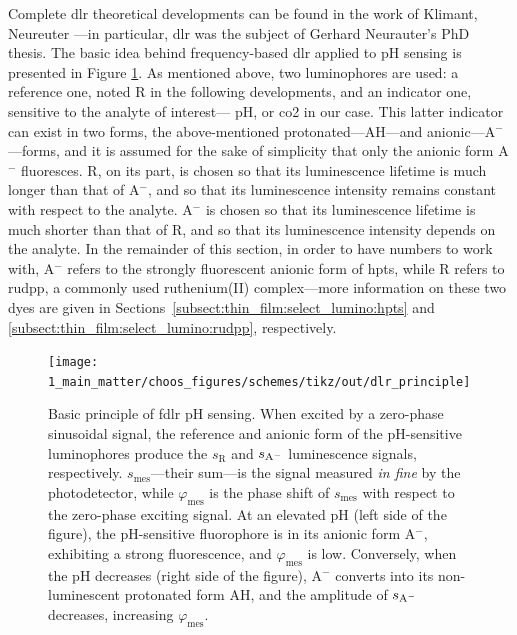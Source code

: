 Complete \gls{dlr} theoretical developments can be found in the work of Klimant, Neureuter \etal{}\cite{neurauter2000_phd, klimant2001_pap}---in particular, \gls{dlr} was the subject of Gerhard Neurauter's PhD thesis. The basic idea behind frequency-based \gls{dlr} applied to pH sensing is presented in Figure \ref{fig:choos:dye_based:dlr_theory:dlr_principle}. As mentioned above, two luminophores are used: a reference one, noted R in the following developments, and an indicator one, sensitive to the analyte of interest---\ie{} pH, or \gls{co2} in our case. This latter indicator can exist in two forms, the above-mentioned protonated---AH---and anionic---A$^-$---forms, and it is assumed for the sake of simplicity that only the anionic form A$^-$ fluoresces. R, on its part, is chosen so that its luminescence lifetime is much longer than that of A$^-$, and so that its luminescence intensity remains constant with respect to the analyte. A$^-$ is chosen so that its luminescence lifetime is much shorter than that of R, and so that its luminescence intensity depends on the analyte. In the remainder of this section, in order to have numbers to work with, A$^-$ refers to the strongly fluorescent anionic form of \gls{hpts}, while R refers to \gls{rudpp}, a commonly used ruthenium(II) complex---more information on these two dyes are given in Sections~\ref{subsect:thin_film:select_lumino:hpts} and \ref{subsect:thin_film:select_lumino:rudpp}, respectively.

\begin{figure} %
	\centering
	\texttt{[image: 1\_main\_matter/choos\_figures/schemes/tikz/out/dlr\_principle]}
	\caption[Basic principle of \gls{fdlr} pH sensing.]{Basic principle of \gls{fdlr} pH sensing. When excited by a zero-phase sinusoidal signal, the reference and anionic form of the pH-sensitive luminophores produce the  $s_\text{R}$ and $s_\mathrm{A^{\smash{-}}}$ luminescence signals, respectively. $s_\text{mes}$---their sum---is the signal measured \emph{in fine} by the photodetector, while $\varphi_\text{mes}$ is the phase shift of $s_\text{mes}$ with respect to the zero-phase exciting signal. At an elevated pH (left side of the figure), the pH-sensitive fluorophore is in its anionic form A$^-$, exhibiting a strong fluorescence, and $\varphi_\text{mes}$ is low. Conversely, when the pH decreases (right side of the figure), A$^-$ converts into its non-luminescent protonated form AH, and the amplitude of $s_\mathrm{A^{\smash{-}}}$ decreases, increasing $\varphi_\text{mes}$.}
	\label{fig:choos:dye_based:dlr_theory:dlr_principle}
\end{figure}

